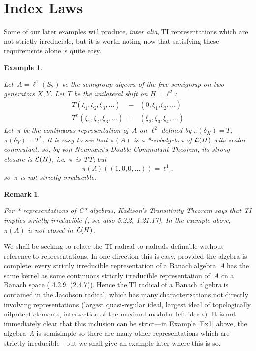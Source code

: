 \documentclass[11pt]{article}
\newcommand{\ie}{i.e.\ }
\newtheorem{example}[thm]{Example}
\newtheorem{remk}[thm]{Remark}
\newenvironment{Example}{\begin{example}\begin{rm}}{\end{rm}\end{example}}
\newenvironment{Remark}{\begin{remk}\begin{rm}}{\end{rm}\end{remk}}
\newcommand{\LH}{{\cal L}(H)}
\begin{document}
\section{Index Laws}\label{S3}

Some of our later examples will produce, {\em inter alia}, TI representations
which are not strictly irreducible, but it is worth noting now that
satisfying these requirements alone is quite easy.

\begin{Example}\label{Ex1}
Let~$A= \ell^1(S_2)$ be the semigroup algebra of the free semigroup on two
generators $X,Y$.    Let~$T$ be the unilateral shift on $H=\ell^2$:
\begin{eqnarray*}
T(\xi_1,\xi_2,\xi_3,\dots) & = & (0,\xi_1,\xi_2,\dots)\\
T^*(\xi_1,\xi_2,\xi_3,\dots) & = & (\xi_2,\xi_3,\xi_4,\dots)
\end{eqnarray*}
Let~$\pi$ be the continuous representation of~$A$ on $\ell^2$ defined by
$\pi(\delta_X) = T$, $\pi(\delta_Y) = T^*$.   It is easy to see that
$\pi(A)$ is a *-subalgebra of $\LH$ with scalar commutant, so, by von Neumann's
Double Commutant Theorem, its strong closure is $\LH$, \ie $\pi$ is TT; but
$$\pi(A)((1,0,0,\dots))  = \ell^1,$$ so~$\pi$ is not strictly irreducible.
\end{Example}

\begin{Remark}
For *-representations of C*-algebras,
Kadison's Transitivity Theorem says that TI implies strictly irreducible
(\cite{Kadison}, see also \cite{Murphy} 5.2.2, \cite{Sakai} 1.21.17).  In
the example above, $\pi(A)$ is not closed in $\LH$.
\end{Remark}

We shall be seeking to relate the TI radical to radicals definable without
reference to representations.    In one direction this is easy, provided the
algebra is complete:  every strictly irreducible representation of a Banach algebra~$A$ has the
same kernel as some continuous strictly irreducible representation of~$A$ on a Banach
space (\cite{Palmerbk} 4.2.9, \cite{Rickart} (2.4.7)).    Hence the TI radical
of a Banach algebra is contained in the Jacobson radical, which has many
characterizations not directly involving representations (largest quasi-regular
ideal, largest ideal of topologically nilpotent elements, intersection of the
maximal modular left ideals).   It is not immediately clear
that this inclusion can be strict---in Example \ref{Ex1} above, the algebra~$A$
is semisimple so there are many other representations which are strictly
irreducible---but we shall give an example later where this is so.
\end{document}
